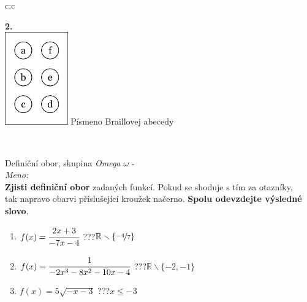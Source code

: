 \documentclass[10pt]{report}
\begin{document}
\begin{tabular}{c:c}
\begin{minipage}[c][99mm][t]{0.49\linewidth}
\begin{center}
\begin{minipage}{0.77\linewidth}
\begin{center}
\begin{varwidth}{\textwidth}
\begin{enumerate}
\end{enumerate}
\end{varwidth}
\end{center}
\end{minipage}
\begin{minipage}{0.20\linewidth}
\begin{center}
{\Huge\bfseries 2.} \\[2mm]
\includegraphics[height=40mm]{../images/braille.png}
{\small Písmeno Braillovej abecedy}
\end{center}
\end{minipage}
\end{center}
\end{minipage}
\\ \hdashline
\begin{minipage}[c][99mm][t]{0.49\linewidth}
\begin{center}
\vspace{7mm}
{\huge Definiční obor, skupina \textit{Omega $\omega$} -}\\[4.5mm]
\textit{Meno:}\phantom{xxxxxxxxxxxxxxxxxxxxxxxxxxxxxxxxxxxxxxxxxxxxxxxxxxxxxxxxxxxxxxxxx}\\[3.5mm]
\textbf{Zjisti definiční obor} zadaných funkcí. Pokud se shoduje s tím za otazníky,\\tak napravo obarvi příslušející kroužek načerno. \textbf{Spolu odevzdejte výsledné slovo}.\\[3mm]
\begin{minipage}{0.77\linewidth}
\begin{center}
\begin{varwidth}{\textwidth}
\begin{enumerate}
\normalsize
\item $f(x)=\cfrac{2x+3}{-7x-4}$\quad \dotfill\; ???\;\dotfill \quad $\mathbb{R}\smallsetminus\{\nicefrac{-4}{7}\}$
\item $f(x)=\cfrac{1}{-2x^3-8x^2-10x-4}$\quad \dotfill\; ???\;\dotfill \quad $\mathbb{R}\smallsetminus\{-2,-1\}$
\item $f(x)=5\sqrt{-x-3}$\quad \dotfill\; ???\;\dotfill \quad $x\leq-3$

\end{enumerate}
\end{varwidth}
\end{center}
\end{minipage}
\end{center}
\end{minipage}
\end{tabular}
\end{document}
